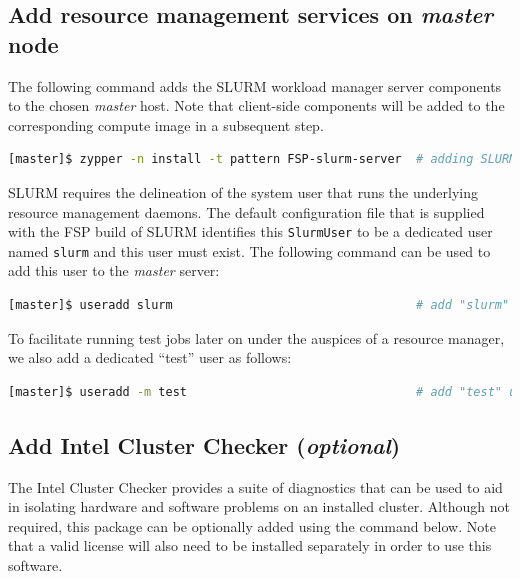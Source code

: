 \documentclass[letterpaper]{article}
\begin{document}
\subsection{Add resource management services on {\em master} node} \label{sec:add_rm}

The following command adds the SLURM workload manager server components to the
chosen {\em master} host. Note that client-side components will be added to
the corresponding compute image in a subsequent step.

\begin{lstlisting}[language=bash,keywords={}]
[master]$ zypper -n install -t pattern FSP-slurm-server  # adding SLURM server support
\end{lstlisting}

SLURM requires the delineation of the system user that runs the underlying
resource management daemons. The default configuration file that is supplied
with the FSP build of SLURM identifies this \texttt{SlurmUser} to be a
dedicated user named \texttt{slurm} and this user must exist. 
The following command can be used to add this user to the {\em
  master} server:

\begin{lstlisting}[language=bash,keywords={}]
[master]$ useradd slurm                                  # add "slurm" user
\end{lstlisting}

To facilitate running test jobs later on under the auspices of a resource
manager, we also add a dedicated ``test'' user as follows:

\begin{lstlisting}[language=bash,keywords={}]
[master]$ useradd -m test                                # add "test" user
\end{lstlisting}

\subsection{Add Intel Cluster Checker ({\em optional})} \label{sec:add_clck}

The Intel Cluster Checker provides a suite of diagnostics that can be used to
aid in isolating hardware and software problems on an installed
cluster. Although not required, this package can be optionally added using the
command below. Note that a valid license will also need to be installed
separately in order to use this software.
\end{document}
